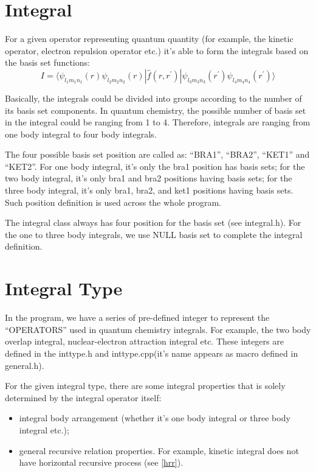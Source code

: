 \section{Integral}
%
%
\label{integral}

For a given operator representing quantum quantity (for example,
the kinetic operator, electron repulsion operator etc.) it's able 
to form the integrals based on the basis set functions:
\begin{equation}
 I = \langle \psi_{l_{1}m_{1}n_{1}}(r)\psi_{l_{2}m_{2}n_{2}}(r)| 
 \hat{f}(r,r^{'})| \psi_{l_{3}m_{3}n_{3}}(r^{'})
 \psi_{l_{4}m_{4}n_{4}}(r^{'})\rangle
\end{equation}

Basically, the integrals could be divided into groups according to the number
of its basis set components. In quantum chemistry, the possible
number of basis set in the integral could be ranging from 1 to 
4. Therefore, integrals are ranging from one body integral to 
four body integrals. 

The four possible basis set position are called as: ``BRA1'', ``BRA2'',
``KET1'' and ``KET2''. For one body integral, it's only the bra1
position has basis sets; for the two body integral, it's only 
bra1 and bra2 positions having basis sets; for the three body integral, 
it's only bra1, bra2, and ket1 positions having basis sets. 
Such position definition is used across the whole program.

The integral class always has four position for the basis set (see 
integral.h). For the one to three body integrals, we use NULL
basis set to complete the integral definition.

\section{Integral Type}
%
%
\label{inttype}

In the program, we have a series of pre-defined integer to represent 
the ``OPERATORS'' used in quantum chemistry integrals. For example,
the two body overlap integral, nuclear-electron attraction integral
etc. These integers are defined in the inttype.h and inttype.cpp(it's 
name appears as macro defined in general.h).

For the given integral type, there are some integral properties that 
is solely determined by the integral operator itself:
\begin{itemize}
 \item integral body arrangement (whether it's one body integral or 
 three body integral etc.);
 \item general recursive relation properties. For example, kinetic
	 integral does not have horizontal recursive process (see \ref{hrr}).
\end{itemize}

